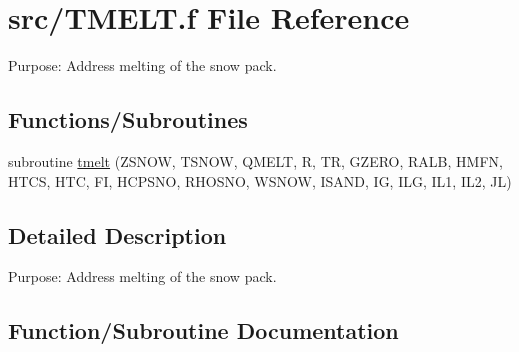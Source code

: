 \hypertarget{TMELT_8f}{}\section{src/\+T\+M\+E\+L\+T.f File Reference}
\label{TMELT_8f}


Purpose\+: Address melting of the snow pack.  


\subsection*{Functions/\+Subroutines}
\begin{DoxyCompactItemize}
\item 
subroutine \hyperlink{TMELT_8f_aad6f10137f2154cc02903988c6a60107}{tmelt} (Z\+S\+N\+O\+W, T\+S\+N\+O\+W, Q\+M\+E\+L\+T, R, T\+R, G\+Z\+E\+R\+O, R\+A\+L\+B, H\+M\+F\+N, H\+T\+C\+S, H\+T\+C, F\+I, H\+C\+P\+S\+N\+O, R\+H\+O\+S\+N\+O, W\+S\+N\+O\+W, I\+S\+A\+N\+D, I\+G, I\+L\+G, I\+L1, I\+L2, J\+L)
\end{DoxyCompactItemize}


\subsection{Detailed Description}
Purpose\+: Address melting of the snow pack. 



\subsection{Function/\+Subroutine Documentation}
\hypertarget{TMELT_8f_aad6f10137f2154cc02903988c6a60107}{}
